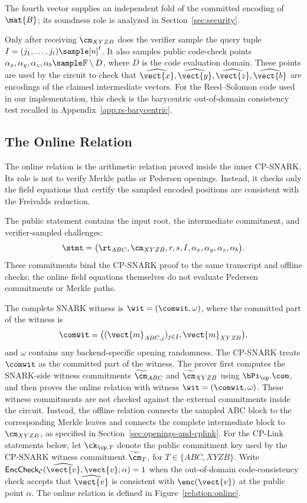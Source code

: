 The fourth vector supplies an independent fold of the committed encoding of
\(\mat{B}\); its soundness role is analyzed in Section~\ref{sec:security}.

Only after receiving \(\cm_{XYZB}\) does the verifier sample the query tuple
{\footnotesize \(I=(j_1,\ldots,j_t)\sample [n]^t\).}
It also samples public code-check points
{\footnotesize
\(\alpha_x,\alpha_y,\alpha_z,\alpha_b\sample\mathbb{F}\setminus D\),
}
where \(D\) is the
code evaluation domain. These points are used by the circuit to check that
{\footnotesize
\(\widehat{\vect{x}},\widehat{\vect{y}},\widehat{\vect{z}},
\widehat{\vect{b}}\)
}
are encodings of
the claimed intermediate vectors. For the Reed--Solomon code used in our
implementation, this check is the barycentric out-of-domain consistency test
recalled in Appendix~\ref{app:rs-barycentric}.


\subsection{The Online Relation}
\label{sec:snark-relation}
The online relation is the arithmetic relation proved inside the
inner CP-SNARK.  Its role is not to verify Merkle paths or Pedersen openings.
Instead, it checks only the field equations that certify the sampled encoded
positions are consistent with the Freivalds reduction.

The public statement contains the input root, the intermediate commitment, and verifier-sampled
challenges:
\[
\stmt = \big( \rt_{ABC},\cm_{XYZB},r,s,I,\alpha_x,\alpha_y,\alpha_z,\alpha_b
  \big).
\]
These commitments bind the CP-SNARK proof to the same transcript and offline
checks; the online field equations themselves do not evaluate Pedersen
commitments or Merkle paths.

The complete SNARK witness is
  $\wit=(\comwit,\omega)$,
where the committed part of the witness is
\[
\comwit = \big( (\vect{m}_{ABC,j})_{j\in I},\vect{m}_{XYZB} \big),
\]
and \(\omega\) contains any backend-specific opening randomness.
The CP-SNARK treats \(\comwit\) as the committed part of the witness.  The
prover first computes the SNARK-side witness commitments
\(\widetilde{\cm}_{ABC}\) and \(\widetilde{\cm}_{XYZB}\) using
\(\bPi_{\cp}.\com\), and then proves the online relation with witness
\(\wit=(\comwit,\omega)\).  These witness commitments are not checked against
the external commitments inside the circuit.  Instead, the offline relation
connects the sampled ABC block to the corresponding Merkle leaves and connects
the complete intermediate block to \(\cm_{XYZB}\), as specified in
Section~\ref{sec:openings-and-cplink}.
For the CP-Link statements below, let \(\ck_{\cp,T}\) denote the public
commitment key used by the CP-SNARK witness commitment
\(\widetilde{\cm}_{T}\), for \(T\in\{ABC,XYZB\}\).
Write
  $\mathsf{EncCheck}_{\mathcal{C}}(\widehat{\vect{v}},\vect{v};\alpha)=1$
when the out-of-domain code-consistency check accepts that
\(\widehat{\vect{v}}\) is consistent with \(\enc(\vect{v})\) at the public
point \(\alpha\).  The online relation is defined in
Figure~\ref{relation:online}.

